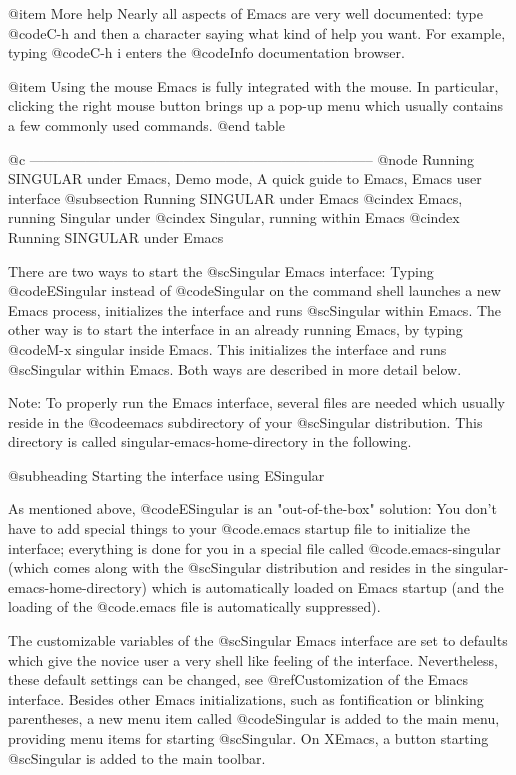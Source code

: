 @item More help
Nearly all aspects of Emacs are very well documented: type
@code{C-h}  and then a character saying what kind of help you want.
For example, typing @code{C-h i} enters the @code{Info} documentation
browser.

@item Using the mouse
Emacs is fully integrated with the mouse. In particular, clicking the
right mouse button brings up a pop-up menu which usually contains a few
commonly used commands.
@end table

@c --------------------------------------------------------------------------
@node Running SINGULAR under Emacs, Demo mode, A quick guide to Emacs, Emacs user interface
@subsection Running SINGULAR under Emacs
@cindex Emacs, running Singular under
@cindex Singular, running within Emacs
@cindex Running SINGULAR under Emacs

There are two ways to start the @sc{Singular} Emacs interface: Typing
@code{ESingular} instead of @code{Singular} on the command shell
launches a new Emacs process, initializes the interface and runs
@sc{Singular} within Emacs. The other way is to start the interface in
an already running Emacs, by typing @code{M-x singular} inside
Emacs. This initializes the interface and runs @sc{Singular} within
Emacs. Both ways are described in more detail below.

Note: To properly run the Emacs interface, several files are needed
which usually reside in the @code{emacs} subdirectory of your
@sc{Singular} distribution. This directory is called
singular-emacs-home-directory in the following.

@subheading Starting the interface using ESingular

As mentioned above, @code{ESingular} is an "out-of-the-box" solution:
You don't have to add special things to your @code{.emacs} startup file
to initialize the interface; everything is done for you in a special
file called @code{.emacs-singular} (which comes along with the
@sc{Singular} distribution and resides in the
singular-emacs-home-directory) which is automatically loaded on Emacs
startup (and the loading of the @code{.emacs} file is automatically
suppressed).

The customizable variables of the @sc{Singular} Emacs interface are set
to defaults which give the novice user a very shell like
feeling of the interface. Nevertheless, these default settings can be
changed, see @ref{Customization of the Emacs interface}. Besides other
Emacs initializations, such as fontification or blinking parentheses, a
new menu item called @code{Singular} is added to the main menu,
providing menu items for starting @sc{Singular}. On XEmacs, a button
starting @sc{Singular} is added to the main toolbar.

